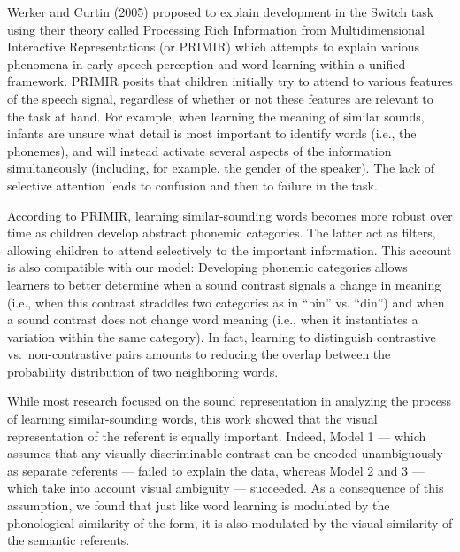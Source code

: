 \documentclass[english,,man,floatsintext]{apa6}
\theoremstyle{definition}
\theoremstyle{definition}
\theoremstyle{definition}
\theoremstyle{remark}
\begin{document}
Werker and Curtin (2005) proposed to explain development in the Switch
task using their theory called Processing Rich Information from
Multidimensional Interactive Representations (or PRIMIR) which attempts
to explain various phenomena in early speech perception and word
learning within a unified framework. PRIMIR posits that children
initially try to attend to various features of the speech signal,
regardless of whether or not these features are relevant to the task at
hand. For example, when learning the meaning of similar sounds, infants
are unsure what detail is most important to identify words (i.e., the
phonemes), and will instead activate several aspects of the information
simultaneously (including, for example, the gender of the speaker). The
lack of selective attention leads to confusion and then to failure in
the task.

According to PRIMIR, learning similar-sounding words becomes more robust
over time as children develop abstract phonemic categories. The latter
act as filters, allowing children to attend selectively to the important
information. This account is also compatible with our model: Developing
phonemic categories allows learners to better determine when a sound
contrast signals a change in meaning (i.e., when this contrast straddles
two categories as in \enquote{bin} vs. \enquote{din}) and when a sound
contrast does not change word meaning (i.e., when it instantiates a
variation within the same category). In fact, learning to distinguish
contrastive vs.~non-contrastive pairs amounts to reducing the overlap
between the probability distribution of two neighboring words.

While most research focused on the sound representation in analyzing the
process of learning similar-sounding words, this work showed that the
visual representation of the referent is equally important. Indeed,
Model 1 --- which assumes that any visually discriminable contrast can
be encoded unambiguously as separate referents --- failed to explain the
data, whereas Model 2 and 3 --- which take into account visual ambiguity
--- succeeded. As a consequence of this assumption, we found that just
like word learning is modulated by the phonological similarity of the
form, it is also modulated by the visual similarity of the semantic
referents.
\end{document}
